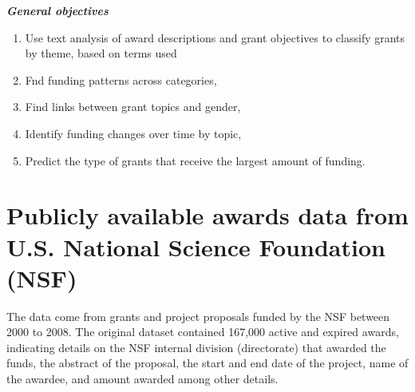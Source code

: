 \documentclass[11pt, oneside]{article}   	%
\begin{document}
\begin{flushleft}
 \textbf{\emph{General objectives} }
\end{flushleft}

\begin{enumerate}
\item Use text analysis of award descriptions and grant objectives to classify grants by theme, based on terms used
\item Fnd funding patterns across categories,
\item Find links between grant topics and gender,
\item Identify funding changes over time by topic,
\item Predict the type of grants that receive the largest amount of funding.
\end{enumerate}


\section{Publicly available awards data from U.S. National Science Foundation (NSF) }

The data come from grants and project proposals funded by the NSF between 2000 to 2008. The original dataset contained 167,000 active and expired awards, indicating details on the NSF internal division (directorate) that awarded the funds, the abstract of the proposal, the start and end date of the project, name of the awardee, and amount awarded among other details.
\end{document}
